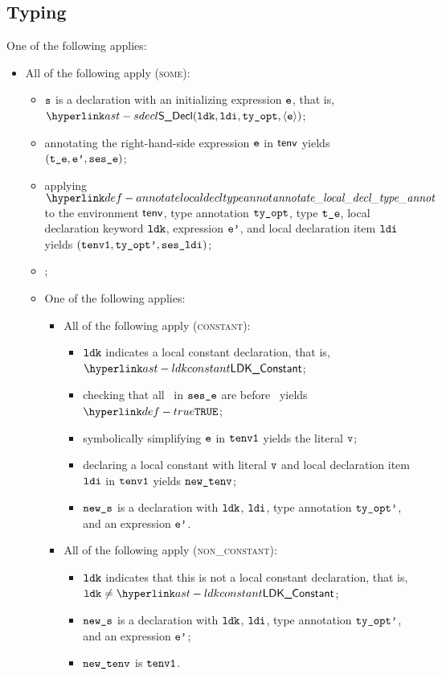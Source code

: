 \subsection{Typing}
\ProseParagraph
One of the following applies:
\begin{itemize}
  \item All of the following apply (\textsc{some}):
  \begin{itemize}
    \item $\texttt{s}$ is a declaration with an initializing expression $\texttt{e}$,
          that is, $\SDecl(\ldk, \ldi, \tyopt, \langle\ve\rangle)$;
    \item annotating the right-hand-side expression $\texttt{e}$ in $\textsf{tenv}$ yields $(\texttt{t\_e},\texttt{e'}, \texttt{ses\_e})$\ProseOrTypeError;
    \item applying $\annotatelocaldecltypeannot$ to the environment $\textsf{tenv}$, type annotation $\texttt{ty\_opt}$, type $\texttt{t\_e}$, local declaration keyword $\texttt{ldk}$, expression $\texttt{e'}$, and local declaration item $\texttt{ldi}$ yields $(\texttt{tenv1}, \texttt{ty\_opt'}, \texttt{ses\_ldi})$\ProseOrTypeError;
    \item {};
    \item One of the following applies:
    \begin{itemize}
      \item All of the following apply (\textsc{constant}):
      \begin{itemize}
        \item $\texttt{ldk}$ indicates a local constant declaration, that is, $\LDKConstant$;
        \item checking that all \timeframesterm\ in $\texttt{ses\_e}$ are before \timeframeconstant\ yields $\True$\ProseOrTypeError;
        \item symbolically simplifying $\texttt{e}$ in $\texttt{tenv1}$ yields the literal $\texttt{v}$\ProseOrTypeError;
        \item declaring a local constant with literal $\texttt{v}$ and local declaration item $\texttt{ldi}$ in $\texttt{tenv1}$ yields $\texttt{new\_tenv}$;
        \item $\texttt{new\_s}$ is a declaration with $\texttt{ldk}$, $\texttt{ldi}$, type annotation $\texttt{ty\_opt'}$, and an expression $\texttt{e'}$.
      \end{itemize}

      \item All of the following apply (\textsc{non\_constant}):
      \begin{itemize}
        \item $\texttt{ldk}$ indicates that this is not a local constant declaration, that is, $\ldk\neq\LDKConstant$;
        \item $\texttt{new\_s}$ is a declaration with $\texttt{ldk}$, $\texttt{ldi}$, type annotation $\texttt{ty\_opt'}$, and an expression $\texttt{e'}$;
        \item $\texttt{new\_tenv}$ is $\texttt{tenv1}$.
      \end{itemize}
    \end{itemize}
  \end{itemize}


\end{itemize}
